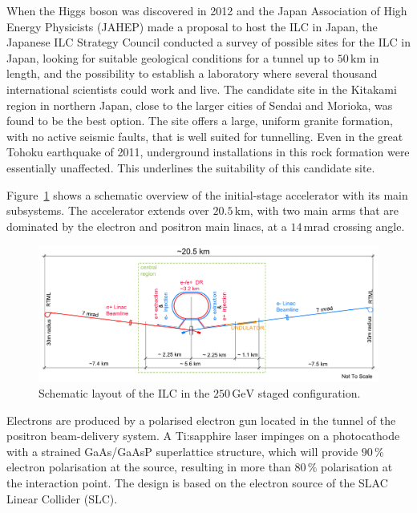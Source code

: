 \documentclass[%
reprint,
 floatfix,
 amsmath,amssymb,
 aps,
]{revtex4-1}
\begin{document}
When the Higgs boson was discovered in 2012 and the Japan
 Association of High Energy Physicists (JAHEP) made a proposal to host the ILC in Japan,
the Japanese ILC Strategy Council conducted a survey of possible sites
for the ILC in Japan, looking for  suitable geological conditions
 for a tunnel up to $50\,{\mathrm{km}}$ in length, and the possibility to establish a
 laboratory where several thousand international scientists could  work and live. 
The candidate site in the Kitakami region in
 northern Japan, close to the larger cities of Sendai and Morioka, 
was found to be the best option. 
The site offers a large, uniform granite formation, 
with no active seismic faults, that is well suited for tunnelling.
Even in the great Tohoku earthquake of 2011,  underground installations
in this rock formation were essentially unaffected. This  underlines
 the suitability of this candidate site. 

Figure~\ref{fig_ilc-schematic} shows a schematic overview of the
initial-stage 
accelerator with its main subsystems.
The accelerator extends over $20.5\,{\mathrm{km}}$, with two main arms that are dominated by the electron and positron main linacs, at a $14\,{\mathrm{mrad}}$ crossing angle.

 \begin{figure}[tb]
 \begin{center}
 \includegraphics[width=\hsize]{figures/TDR-machine-layout-cartoon-staged-mirror.pdf}
\caption{Schematic layout of the ILC
 in the $250\,{\mathrm{GeV}}$ staged configuration.
\label{fig_ilc-schematic}}
 \end{center}
 \vspace{-0.7cm}
 \end{figure}

Electrons are produced by a polarised electron gun located in the
tunnel of the positron beam-delivery system. A Ti:sapphire laser
impinges on a photocathode with a strained GaAs/GaAsP superlattice
structure, which will provide  $90\,\%$ electron polarisation at the
source, resulting in more than $80\,\%$ polarisation at the interaction
point. The design is based on the electron source of the SLAC
Linear Collider (SLC). 
\end{document}
